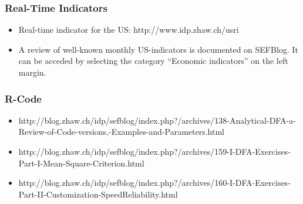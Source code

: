 \documentclass[11pt]{article}
\begin{document}
\subsubsection{Real-Time Indicators}

\begin{itemize}
\item Real-time indicator for the US: http://www.idp.zhaw.ch/usri
\item A review of well-known monthly US-indicators is documented on SEFBlog. It can be acceded by selecting the category ``Economic indicators'' on the left margin.
\end{itemize}


\subsubsection{R-Code}

\begin{itemize}
\item
http://blog.zhaw.ch/idp/sefblog/index.php?/archives/138-Analytical-DFA-a-Review-of-Code-versions,-Examples-and-Parameters.html
\item http://blog.zhaw.ch/idp/sefblog/index.php?/archives/159-I-DFA-Exercises-Part-I-Mean-Square-Criterion.html
\item http://blog.zhaw.ch/idp/sefblog/index.php?/archives/160-I-DFA-Exercises-Part-II-Customization-SpeedReliability.html


\end{itemize}




\end{document}
